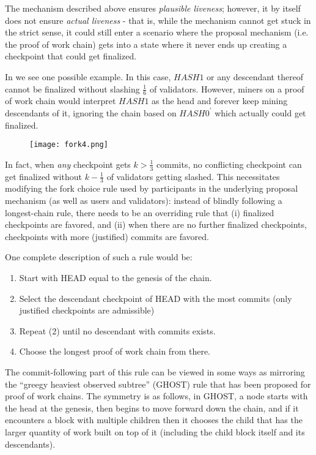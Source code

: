 \documentclass[12pt, final]{article}
\begin{document}
The mechanism described above ensures \textit{plausible liveness}; however, it by itself does not ensure \textit{actual liveness} - that is, while the mechanism cannot get stuck in the strict sense, it could still enter a scenario where the proposal mechanism (i.e. the proof of work chain) gets into a state where it never ends up creating a checkpoint that could get finalized.

In  we see one possible example.  In this case, $HASH1$ or any descendant thereof cannot be finalized without slashing $\frac{1}{6}$ of validators. However, miners on a proof of work chain would interpret $HASH1$ as the head and forever keep mining descendants of it, ignoring the chain based on $HASH0^\prime$ which actually could get finalized.

\begin{figure}[h!tb]
\centering
\texttt{[image: fork4.png]}
\caption{}
\label{fig:forkchoice}
\end{figure}

In fact, when \textit{any} checkpoint gets $k > \frac{1}{3}$ commits, no conflicting checkpoint can get finalized without $k - \frac{1}{3}$ of validators getting slashed. This necessitates modifying the fork choice rule used by participants in the underlying proposal mechanism (as well as users and validators): instead of blindly following a longest-chain rule, there needs to be an overriding rule that (i) finalized checkpoints are favored, and (ii) when there are no further finalized checkpoints, checkpoints with more (justified) commits are favored.

One complete description of such a rule would be:

\begin{enumerate}
\item Start with HEAD equal to the genesis of the chain.
\item Select the descendant checkpoint of HEAD with the most commits (only justified checkpoints are admissible)
\item Repeat (2) until no descendant with commits exists.
\item Choose the longest proof of work chain from there.
\end{enumerate}

The commit-following part of this rule can be viewed in some ways as mirroring the ``greegy heaviest observed subtree'' (GHOST) rule that has been proposed for proof of work chains\cite{sompolinsky2013accelerating}. The symmetry is as follows, in GHOST, a node starts with the head at the genesis, then begins to move forward down the chain, and if it encounters a block with multiple children then it chooses the child that has the larger quantity of work built on top of it (including the child block itself and its descendants).
\end{document}
